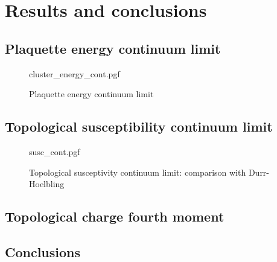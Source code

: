 \chapter{Results and conclusions}\label{ch:results}

\section{Plaquette energy continuum limit}

\begin{figure}[!htb]
    \centering
    {cluster_energy_cont.pgf}
    \caption{Plaquette energy continuum limit}
    \label{fig:cluster_energy_cont}
\end{figure}

\section{Topological susceptibility continuum limit}

\begin{figure}[!htb]
    \centering
    {susc_cont.pgf}
    \caption{Topological susceptivity continuum limit: comparison with Durr-Hoelbling}
    \label{fig:susc_cont}
\end{figure}

\section{Topological charge fourth moment}

\section{Conclusions}

